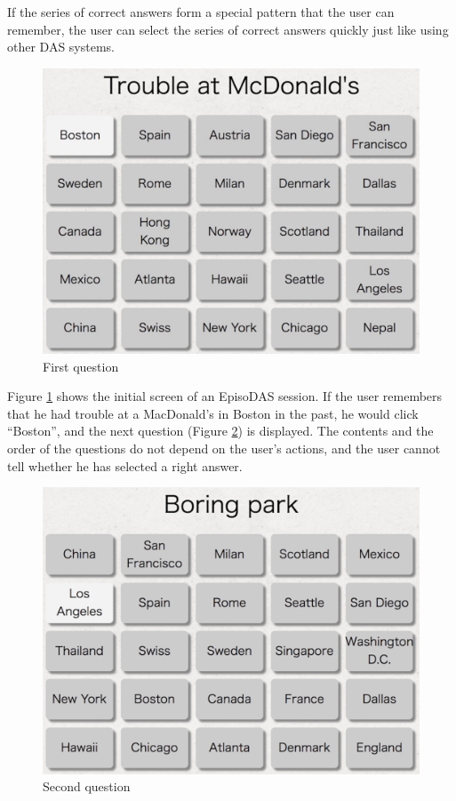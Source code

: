\documentclass[sigconf]{acmart}
\begin{document}
If the series of correct answers form a special pattern
that the user can remember,
the user can select the series of correct answers quickly
just like using other DAS systems.


\begin{figure}[H]
  \includegraphics[width=12cm,bb=0 0 1398 1060]{figures/EpisoDAS1.jpg}
  \caption{First question}
  \label{EpisoDAS1}
\end{figure}

Figure \ref{EpisoDAS1} shows
the initial screen of an EpisoDAS session.
%
If the user remembers that he had trouble at a MacDonald's in Boston in the past,
he would click ``Boston'', and the next question (Figure \ref{EpisoDAS2}) is displayed.
The contents and the order of the questions
do not depend on the user's actions, and
the user cannot tell whether he has selected a right answer.

\begin{figure}[H]
  \includegraphics[width=12cm,bb=0 0 1396 1062]{figures/EpisoDAS2.jpg}
  \caption{Second question}
  \label{EpisoDAS2}
\end{figure}
\end{document}
